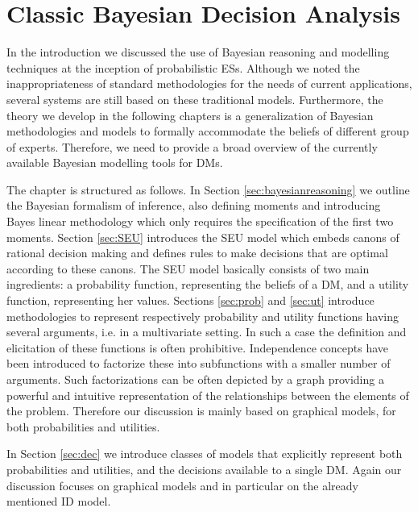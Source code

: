 \chapter{Classic Bayesian Decision Analysis} %

\label{chapter2} %




In the introduction we discussed the use of Bayesian reasoning and modelling techniques at the inception of probabilistic \glspl{ES}. Although we noted the inappropriateness of standard methodologies for the needs of current applications, several systems are still based on these traditional models. Furthermore, the theory we develop in the following chapters is a generalization of Bayesian methodologies and models to formally accommodate the beliefs of different group of experts. Therefore, we need to provide a broad overview of the currently available Bayesian modelling tools for \glspl{DM}. 

The chapter is structured as follows. In Section \ref{sec:bayesianreasoning} we outline the Bayesian formalism of inference, also defining moments and introducing Bayes linear methodology which only requires the specification of the first two moments. Section \ref{sec:SEU} introduces the \acrfull{SEU} model which embeds canons of rational decision making and defines rules to make decisions that are optimal according to these canons. The \gls{SEU} model basically consists of two main ingredients: a probability function, representing the beliefs of a \gls{DM}, and a utility function, representing her values. Sections \ref{sec:prob} and  \ref{sec:ut} introduce methodologies to represent respectively probability and utility functions having several arguments, i.e. in a multivariate setting. In such a case the definition and elicitation of these functions is often prohibitive. Independence concepts have been introduced to factorize these into subfunctions with a smaller number of arguments. Such factorizations can be often depicted by a graph providing a powerful and intuitive representation of the relationships between the elements of the problem. Therefore our discussion is mainly based on graphical models, for both probabilities and utilities.

In Section \ref{sec:dec} we introduce classes of models that explicitly represent both probabilities and utilities, and the decisions available to a single \gls{DM}. Again our discussion focuses on graphical models and in particular on the already mentioned \acrfull{ID} model.

